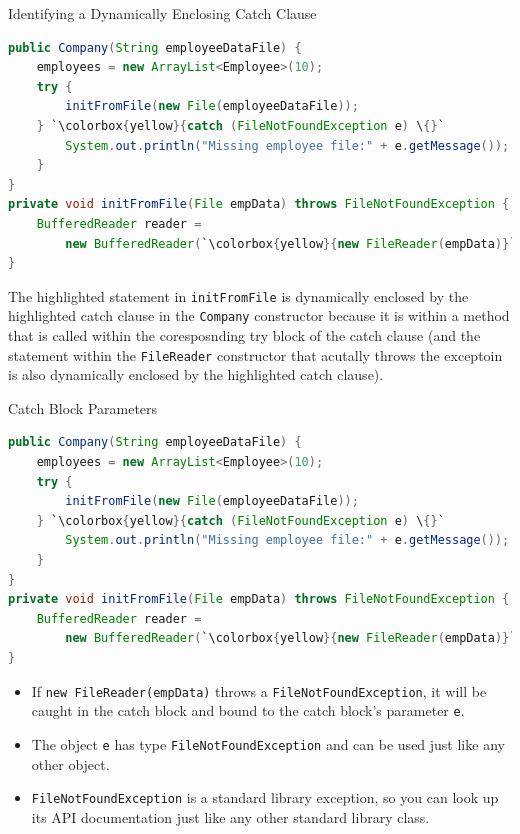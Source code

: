 \documentclass{beamer}
\begin{document}
\begin{frame}[fragile]{Identifying a Dynamically Enclosing Catch Clause}


\begin{lstlisting}[language=Java,escapechar=`]
public Company(String employeeDataFile) {
    employees = new ArrayList<Employee>(10);
    try {
        initFromFile(new File(employeeDataFile));
    } `\colorbox{yellow}{catch (FileNotFoundException e) \{}`
        System.out.println("Missing employee file:" + e.getMessage());
    }
}
private void initFromFile(File empData) throws FileNotFoundException {
    BufferedReader reader =
        new BufferedReader(`\colorbox{yellow}{new FileReader(empData)}`);
}
\end{lstlisting}
\vspace{-.1in}
The highlighted statement in {\tt initFromFile} is dynamically enclosed by the highlighted catch clause in the {\tt Company} constructor because it is within a method that is called within the coresposnding try block of the catch clause (and the statement within the {\tt FileReader} constructor that acutally throws the exceptoin is also dynamically enclosed by the highlighted catch clause).



\end{frame}

\begin{frame}[fragile]{Catch Block Parameters}
\vspace{-.1in}
\begin{lstlisting}[language=Java,escapechar=`]
public Company(String employeeDataFile) {
    employees = new ArrayList<Employee>(10);
    try {
        initFromFile(new File(employeeDataFile));
    } `\colorbox{yellow}{catch (FileNotFoundException e) \{}`
        System.out.println("Missing employee file:" + e.getMessage());
    }
}
private void initFromFile(File empData) throws FileNotFoundException {
    BufferedReader reader =
        new BufferedReader(`\colorbox{yellow}{new FileReader(empData)}`);
}
\end{lstlisting}
\vspace{-.1in}
\begin{itemize}
\item If {\tt new FileReader(empData)} throws a {\tt FileNotFoundException}, it will be caught in the catch block and bound to the catch block's parameter {\tt e}.
\item The object {\tt e} has type {\tt FileNotFoundException} and can be used just like any other object.
\item {\tt FileNotFoundException} is a standard library exception, so you can look up its API documentation just like any other standard library class.
\end{itemize}

\end{frame}
\end{document}
